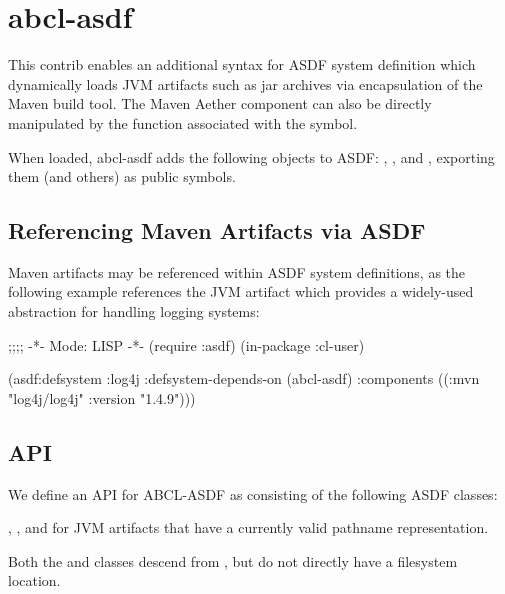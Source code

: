 \documentclass[10pt]{book}
\begin{document}
\section{abcl-asdf}

This contrib enables an additional syntax for \textsc{ASDF} system
definition which dynamically loads \textsc{JVM} artifacts such as jar
archives via encapsulation of the Maven build tool.  The Maven Aether
component can also be directly manipulated by the function associated
with the  symbol.



When loaded, abcl-asdf adds the following objects to \textsc{ASDF}:
, ,  and
, exporting them (and others) as public symbols.

\subsection{Referencing Maven Artifacts via ASDF}

Maven artifacts may be referenced within \textsc{ASDF} system
definitions, as the following example references the
 JVM artifact which provides a widely-used
abstraction for handling logging systems:

\begin{listing-lisp}
  ;;;; -*- Mode: LISP -*-
  (require :asdf)
  (in-package :cl-user)

  (asdf:defsystem :log4j
     :defsystem-depends-on (abcl-asdf)
     :components ((:mvn "log4j/log4j" :version "1.4.9")))
\end{listing-lisp}

\subsection{API}

We define an API for \textsc{ABCL-ASDF} as consisting of the following
ASDF classes:

, , and
 for JVM artifacts that have a currently
valid pathname representation.

Both the  and  classes descend from
, but do not directly have a filesystem location.
\end{document}
